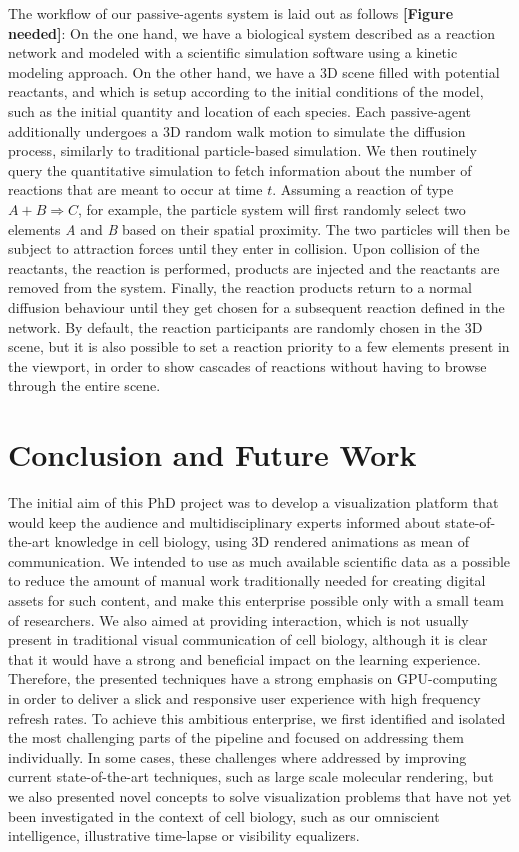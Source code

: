 The workflow of our passive-agents system is laid out as follows \textbf{[Figure needed]}:
On the one hand, we have a biological system described as a reaction network and modeled with a scientific simulation software using a kinetic modeling approach.
On the other hand, we have a 3D scene filled with potential reactants, and which is setup according to the initial conditions of the model, such as the initial quantity and location of each species.
Each passive-agent additionally undergoes a 3D random walk motion to simulate the diffusion process, similarly to traditional particle-based simulation.
We then routinely query the quantitative simulation to fetch information about the number of reactions that are meant to occur at time $t$.
Assuming a reaction of type $A + B \Rightarrow C$, for example, the particle system will first randomly select two elements \textit{A} and \textit{B} based on their spatial proximity.
The two particles will then be subject to attraction forces until they enter in collision.
Upon collision of the reactants, the reaction is performed, products are injected and the reactants are removed from the system.
Finally, the reaction products return to a normal diffusion behaviour until they get chosen for a subsequent reaction defined in the network.
By default, the reaction participants are randomly chosen in the 3D scene, but it is also possible to set a reaction priority to a few elements present in the viewport, in order to show cascades of reactions without having to browse through the entire scene.


\section{Conclusion and Future Work}
\label{sec:section5}

The initial aim of this PhD project was to develop a visualization platform that would keep the audience and multidisciplinary experts informed about state-of-the-art knowledge in cell biology, using 3D rendered animations as mean of communication.
We intended to use as much available scientific data as a possible to reduce the amount of manual work traditionally needed for creating digital assets for such content, and make this enterprise possible only with a small team of researchers.
We also aimed at providing interaction, which is not usually present in traditional visual communication of cell biology, although it is clear that it would have a strong and beneficial impact on the learning experience.
Therefore, the presented techniques have a strong emphasis on GPU-computing in order to deliver a slick and responsive user experience with high frequency refresh rates. 
To achieve this ambitious enterprise, we first identified and isolated the most challenging parts of the pipeline and focused on addressing them individually.
In some cases, these challenges where addressed by improving current state-of-the-art techniques, such as large scale molecular rendering, but we also presented novel concepts to solve visualization problems that have not yet been investigated in the context of cell biology, such as our omniscient intelligence, illustrative time-lapse or visibility equalizers.  

